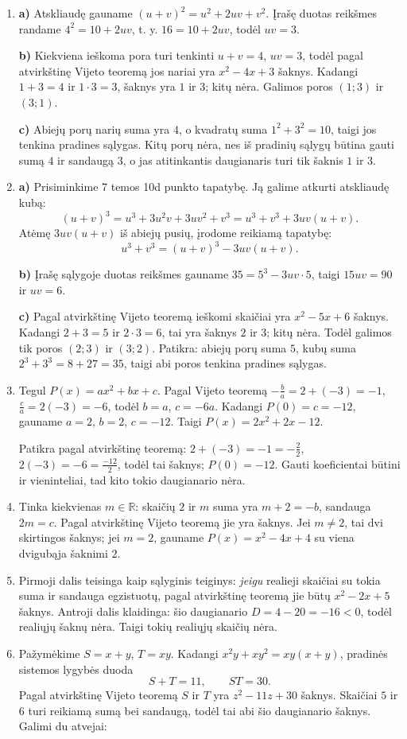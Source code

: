 \documentclass[12pt,a4paper]{article}
\begin{document}
\begin{enumerate}
\textbf{c)} Kai $S^2-4T>0$, yra dvi skirtingos šaknys ir dvi poros. Kai $S^2-4T=0$, yra viena dviguboji šaknis $r$ ir viena pora $(r;r)$; ją tenkina $2r=S$, $r^2=T$ pagal Vijeto teoremą. Kai $S^2-4T<0$, realiųjų šaknų nėra, todėl nėra ir realiųjų porų.
\item \textbf{a)} Atskliaudę gauname $(u+v)^2=u^2+2uv+v^2$. Įrašę duotas reikšmes randame $4^2=10+2uv$, t. y. $16=10+2uv$, todėl $uv=3$.

\textbf{b)} Kiekviena ieškoma pora turi tenkinti $u+v=4$, $uv=3$, todėl pagal atvirkštinę Vijeto teoremą jos nariai yra $x^2-4x+3$ šaknys. Kadangi $1+3=4$ ir $1\cdot3=3$, šaknys yra $1$ ir $3$; kitų nėra. Galimos poros $(1;3)$ ir $(3;1)$.

\textbf{c)} Abiejų porų narių suma yra $4$, o kvadratų suma $1^2+3^2=10$, taigi jos tenkina pradines sąlygas. Kitų porų nėra, nes iš pradinių sąlygų būtina gauti sumą $4$ ir sandaugą $3$, o jas atitinkantis daugianaris turi tik šaknis $1$ ir $3$.
\item \textbf{a)} Prisiminkime 7 temos 10d punkto tapatybę. Ją galime atkurti atskliaudę kubą:
\[(u+v)^3=u^3+3u^2v+3uv^2+v^3=u^3+v^3+3uv(u+v).\]
Atėmę $3uv(u+v)$ iš abiejų pusių, įrodome reikiamą tapatybę:
\[u^3+v^3=(u+v)^3-3uv(u+v).\]

\textbf{b)} Įrašę sąlygoje duotas reikšmes gauname $35=5^3-3uv\cdot5$, taigi $15uv=90$ ir $uv=6$.

\textbf{c)} Pagal atvirkštinę Vijeto teoremą ieškomi skaičiai yra $x^2-5x+6$ šaknys. Kadangi $2+3=5$ ir $2\cdot3=6$, tai yra šaknys $2$ ir $3$; kitų nėra. Todėl galimos tik poros $(2;3)$ ir $(3;2)$. Patikra: abiejų porų suma $5$, kubų suma $2^3+3^3=8+27=35$, taigi abi poros tenkina pradines sąlygas.
\item Tegul $P(x)=ax^2+bx+c$. Pagal Vijeto teoremą $-\frac{b}{a}=2+(-3)=-1$, $\frac{c}{a}=2(-3)=-6$, todėl $b=a$, $c=-6a$. Kadangi $P(0)=c=-12$, gauname $a=2$, $b=2$, $c=-12$. Taigi $P(x)=2x^2+2x-12$.

Patikra pagal atvirkštinę teoremą: $2+(-3)=-1=-\frac{2}{2}$, $2(-3)=-6=\frac{-12}{2}$, todėl tai šaknys; $P(0)=-12$. Gauti koeficientai būtini ir vieninteliai, tad kito tokio daugianario nėra.
\item Tinka kiekvienas $m\in\mathbb R$: skaičių $2$ ir $m$ suma yra $m+2=-b$, sandauga $2m=c$. Pagal atvirkštinę Vijeto teoremą jie yra šaknys. Jei $m\ne2$, tai dvi skirtingos šaknys; jei $m=2$, gauname $P(x)=x^2-4x+4$ su viena dvigubąja šaknimi $2$.
\item Pirmoji dalis teisinga kaip sąlyginis teiginys: \emph{jeigu} realieji skaičiai su tokia suma ir sandauga egzistuotų, pagal atvirkštinę teoremą jie būtų $x^2-2x+5$ šaknys. Antroji dalis klaidinga: šio daugianario $D=4-20=-16<0$, todėl realiųjų šaknų nėra. Taigi tokių realiųjų skaičių nėra.
\item Pažymėkime $S=x+y$, $T=xy$. Kadangi $x^2y+xy^2=xy(x+y)$, pradinės sistemos lygybės duoda
\[S+T=11,\qquad ST=30.\]
Pagal atvirkštinę Vijeto teoremą $S$ ir $T$ yra $z^2-11z+30$ šaknys. Skaičiai $5$ ir $6$ turi reikiamą sumą bei sandaugą, todėl tai abi šio daugianario šaknys. Galimi du atvejai:


\end{enumerate}
\end{document}
